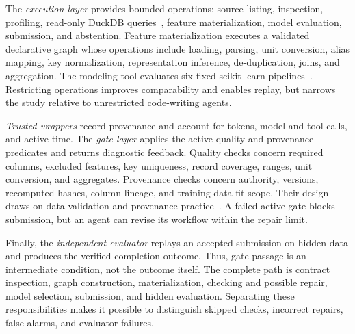 \documentclass[conference]{IEEEtran}
\begin{document}
The \emph{execution layer} provides bounded operations: source listing, inspection, profiling, read-only DuckDB queries~\cite{raasveldt2019duckdb}, feature materialization, model evaluation, submission, and abstention. Feature materialization executes a validated declarative graph whose operations include loading, parsing, unit conversion, alias mapping, key normalization, representation inference, de-duplication, joins, and aggregation. The modeling tool evaluates six fixed scikit-learn pipelines~\cite{pedregosa2011sklearn}. Restricting operations improves comparability and enables replay, but narrows the study relative to unrestricted code-writing agents.

\emph{Trusted wrappers} record provenance and account for tokens, model and tool calls, and active time. The \emph{gate layer} applies the active quality and provenance predicates and returns diagnostic feedback. Quality checks concern required columns, excluded features, key uniqueness, record coverage, ranges, unit conversion, and aggregates. Provenance checks concern authority, versions, recomputed hashes, column lineage, and training-data fit scope. Their design draws on data validation and provenance practice~\cite{polyzotis2019datavalidation,schelter2018deequ,w3c2013provdm}. A failed active gate blocks submission, but an agent can revise its workflow within the repair limit.

Finally, the \emph{independent evaluator} replays an accepted submission on hidden data and produces the verified-completion outcome. Thus, gate passage is an intermediate condition, not the outcome itself. The complete path is contract inspection, graph construction, materialization, checking and possible repair, model selection, submission, and hidden evaluation. Separating these responsibilities makes it possible to distinguish skipped checks, incorrect repairs, false alarms, and evaluator failures.
\end{document}
